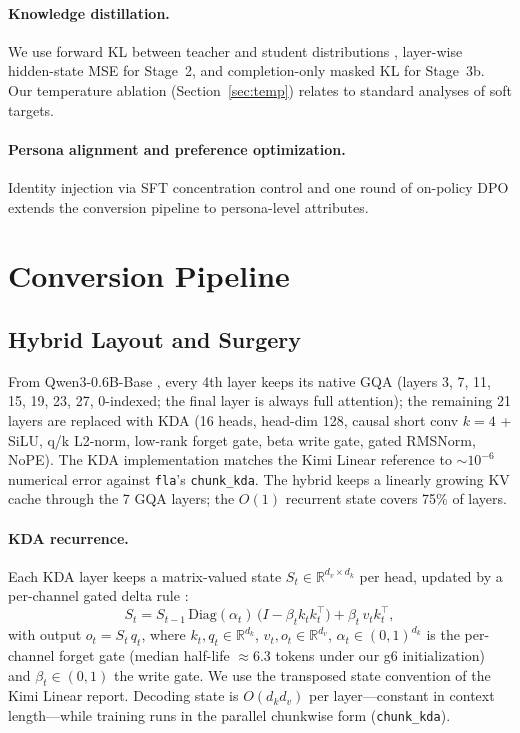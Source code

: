 \documentclass[11pt]{article}
\begin{document}
\paragraph{Knowledge distillation.}
We use forward KL between teacher and student distributions
\citep{hinton2015distilling}, layer-wise hidden-state MSE for Stage~2,
and completion-only masked KL for Stage~3b. Our temperature ablation
(Section~\ref{sec:temp}) relates to standard analyses of soft targets.

\paragraph{Persona alignment and preference optimization.}
Identity injection via SFT concentration control and one round of
on-policy DPO \citep{rafailov2023dpo} extends the conversion pipeline to
persona-level attributes.

\section{Conversion Pipeline}
\label{sec:pipeline}

\subsection{Hybrid Layout and Surgery}

From Qwen3-0.6B-Base \citep{qwen3}, every 4th layer keeps its native GQA
(layers 3, 7, 11, 15, 19, 23, 27, 0-indexed; the final layer is always
full attention); the remaining 21 layers are replaced with KDA (16
heads, head-dim 128, causal short conv $k{=}4$ + SiLU, q/k L2-norm,
low-rank forget gate, beta write gate, gated RMSNorm, NoPE). The KDA
implementation matches the Kimi Linear reference to $\sim$$10^{-6}$
numerical error against \texttt{fla}'s \texttt{chunk\_kda}. The hybrid
keeps a linearly growing KV cache through the 7 GQA layers; the
$O(1)$ recurrent state covers 75\% of layers.

\paragraph{KDA recurrence.}
Each KDA layer keeps a matrix-valued state
$S_t \in \mathbb{R}^{d_v \times d_k}$ per head, updated by a
per-channel gated delta rule \citep{yang2024gated,kimilinear}:
\begin{equation}
S_t = S_{t-1}\,\mathrm{Diag}(\alpha_t)\,\bigl(I - \beta_t k_t k_t^{\top}\bigr) + \beta_t\, v_t k_t^{\top},
\label{eq:kda}
\end{equation}
with output $o_t = S_t\, q_t$, where $k_t, q_t \in \mathbb{R}^{d_k}$,
$v_t, o_t \in \mathbb{R}^{d_v}$, $\alpha_t \in (0,1)^{d_k}$ is the
per-channel forget gate (median half-life $\approx$6.3 tokens under our
g6 initialization) and $\beta_t \in (0,1)$ the write gate. We use the
transposed state convention of the Kimi Linear report. Decoding state
is $O(d_k d_v)$ per layer---constant in context length---while training
runs in the parallel chunkwise form (\texttt{chunk\_kda}).
\end{document}
